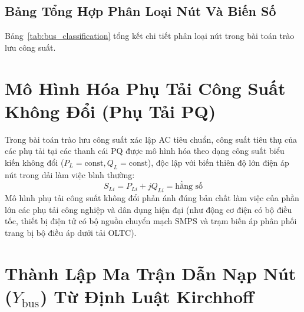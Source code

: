 \documentclass[12pt,a4paper,oneside]{report}
\begin{document}
\subsection{Bảng Tổng Hợp Phân Loại Nút Và Biến Số}
Bảng~\ref{tab:bus_classification} tổng kết chi tiết phân loại nút trong bài toán trào lưu công suất.

\begin{table}[H]
\centering
\caption{Phân loại các nút và biến số trong bài toán trào lưu công suất AC.}
\label{tab:bus_classification}
\end{table}

\section{Mô Hình Hóa Phụ Tải Công Suất Không Đổi (Phụ Tải PQ)}
Trong bài toán trào lưu công suất xác lập AC tiêu chuẩn, công suất tiêu thụ của các phụ tải tại các thanh cái PQ được mô hình hóa theo dạng công suất biểu kiến không đổi ($P_L = \text{const}, Q_L = \text{const}$), độc lập với biến thiên độ lớn điện áp nút trong dải làm việc bình thường:
\begin{equation}
S_{Li} = P_{Li} + j Q_{Li} = \text{hằng số}
\end{equation}
Mô hình phụ tải công suất không đổi phản ánh đúng bản chất làm việc của phần lớn các phụ tải công nghiệp và dân dụng hiện đại (như động cơ điện có bộ điều tốc, thiết bị điện tử có bộ nguồn chuyển mạch SMPS và trạm biến áp phân phối trang bị bộ điều áp dưới tải OLTC).

\section{Thành Lập Ma Trận Dẫn Nạp Nút ($Y_{\text{bus}}$) Từ Định Luật Kirchhoff}
\end{document}
